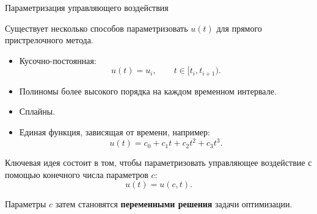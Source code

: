 \documentclass{beamer}
\begin{document}
	
	\begin{frame}{Параметризация управляющего воздействия}
		\begin{flushleft}
			Существует несколько способов параметризовать $u(t)$ для
			прямого пристрелочного метода.
			
			\begin{itemize}
				\item Кусочно-постоянная:
				\[
				u(t)=u_i,
				\qquad
				t\in[t_i,t_{i+1}).
				\]
				
				\item Полиномы более высокого порядка на каждом временном интервале.
				
				\item Сплайны.
				
				\item Единая функция, зависящая от времени, например:
				\[
				u(t)=c_0+c_1t+c_2t^2+c_3t^3.
				\]
			\end{itemize}
			
			\vspace{0.5em}
			
			Ключевая идея состоит в том, чтобы параметризовать управляющее воздействие с помощью
			конечного числа параметров $c$:
			\[
			u(t)=u(c,t).
			\]
			
			Параметры $c$ затем становятся
			\textbf{переменными решения} задачи оптимизации.
		\end{flushleft}
	\end{frame}
	
\end{document}
